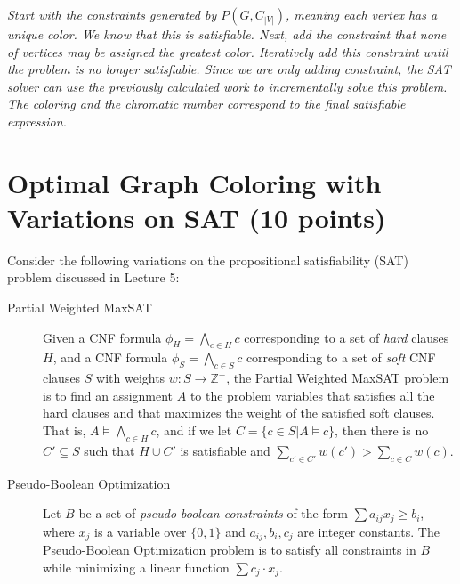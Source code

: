 \documentclass{article}
\newenvironment{solution}{\color{blue} \em }{}
\begin{document}
\begin{enumerate}
\begin{solution}

\end{solution}

\begin{solution}
    Start with the constraints generated by $P(G, C_{|V|})$, meaning each vertex has a unique color. We know that this is satisfiable. Next, add the constraint that none of vertices may be assigned the greatest color. Iteratively add this constraint until the problem is no longer satisfiable. Since we are only adding constraint, the SAT solver can use the previously calculated work to incrementally solve this problem. The coloring and the chromatic number correspond to the final satisfiable expression.
\end{solution}

\end{enumerate}


\section{Optimal Graph Coloring with Variations on SAT (10 points)}\label{varsat}


Consider the following variations on the propositional satisfiability (SAT) problem discussed in Lecture 5:

\begin{description}

	\item[Partial Weighted MaxSAT] Given a CNF formula $\phi_H = \bigwedge_{c \in H} c$ corresponding to a set of \emph{hard} clauses $H$, and a CNF formula $\phi_S = \bigwedge_{c \in S} c$ corresponding to a set of \emph{soft} CNF clauses $S$ with weights $w : S \rightarrow \mathbb{Z^+}$, the Partial Weighted MaxSAT problem is to find an assignment $A$ to the problem variables that satisfies all the hard clauses and that maximizes the weight of the satisfied soft clauses. That is, $A \models \bigwedge_{c \in H} c$, and if we let $C = \{ c\in S | A\models c\}$, then there is no $C'\subseteq S$ such that $H\cup C'$ is satisfiable and $\sum_{c'\in C'} w(c') > \sum_{c\in C} w(c)$.

	\item[Pseudo-Boolean Optimization]  Let $B$ be a set of \emph{pseudo-boolean constraints} of the form $\sum a_{ij}x_j \geq b_i$, where $x_j$ is a variable over $\{0, 1\}$ and $a_{ij}, b_i, c_j$ are integer constants.  The Pseudo-Boolean Optimization problem is to satisfy all constraints in $B$ while minimizing a linear function $\sum c_j \cdot x_j$.
\end{description}
%
\end{document}
